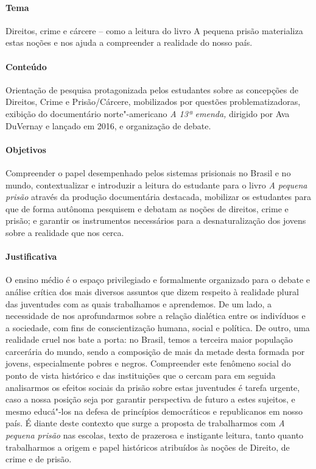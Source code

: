 \documentclass[11pt]{extarticle}
\begin{document}
\paragraph{Tema} Direitos, crime e cárcere -- como a leitura do livro A
pequena prisão materializa estas noções e nos ajuda a compreender a
realidade do nosso país.

\paragraph{Conteúdo} Orientação de pesquisa protagonizada pelos estudantes
sobre as concepções de Direitos, Crime e Prisão/Cárcere, mobilizados por
questões problematizadoras, exibição do documentário norte"-americano
\emph{A 13ª emenda,} dirigido por Ava DuVernay e lançado em 2016, e
organização de debate.

\paragraph{Objetivos} Compreender o papel desempenhado pelos sistemas
prisionais no Brasil e no mundo, contextualizar e introduzir a leitura do
estudante para o livro \emph{A pequena prisão} através da produção
documentária destacada, mobilizar os estudantes para que de forma
autônoma pesquisem e debatam as noções de direitos, crime e prisão; e
garantir os instrumentos necessários para a desnaturalização dos jovens
sobre a realidade que nos cerca.

\paragraph{Justificativa} O ensino médio é o espaço privilegiado e
formalmente organizado para o debate e análise crítica dos mais diversos
assuntos que dizem respeito à realidade plural das juventudes com as
quais trabalhamos e aprendemos. De um lado, a necessidade de nos
aprofundarmos sobre a relação dialética entre os indivíduos e a
sociedade, com fins de conscientização humana, social e política. De
outro, uma realidade cruel nos bate a porta: no Brasil, temos a terceira
maior população carcerária do mundo, sendo a composição de mais da
metade desta formada por jovens, especialmente pobres e negros.
Compreender este fenômeno social do ponto de vista histórico e das
instituições que o cercam para em seguida analisarmos os efeitos sociais
da prisão sobre estas juventudes é tarefa urgente, caso a nossa posição
seja por garantir perspectiva de futuro a estes sujeitos, e mesmo
educá"-los na defesa de princípios democráticos e republicanos em nosso
país. É diante deste contexto que surge a proposta de trabalharmos com
\emph{A pequena prisão} nas escolas, texto de prazerosa e instigante
leitura, tanto quanto trabalharmos a origem e papel históricos
atribuídos às noções de Direito, de crime e de prisão.
\end{document}
